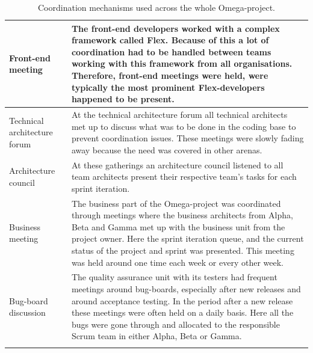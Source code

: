 \begin{center}
\begin{longtable}{| p{3.5cm} | p{8cm} |}
    Front-end meeting & The front-end developers worked with a complex framework called Flex. Because of this a lot of coordination had to be handled between teams working with this framework from all organisations. Therefore, front-end meetings were held, were typically the most prominent Flex-developers happened to be present. \\ \hline
    Technical architecture forum & At the technical architecture forum all technical architects met up to discuss what was to be done in the coding base to prevent coordination issues. These meetings were slowly fading away because the need was covered in other arenas. \\ \hline
    Architecture council & At these gatherings an architecture council listened to all team architects present their respective team's tasks for each sprint iteration. \\ \hline
    Business meeting & The business part of the Omega-project was coordinated through meetings where the business architects from Alpha, Beta and Gamma met up with the business unit from the project owner. Here the sprint iteration queue, and the current status of the project and sprint was presented. This meeting was held around one time each week or every other week. \\ \hline
    Bug-board discussion & The quality assurance unit with its testers had frequent meetings around bug-boards, especially after new releases and around acceptance testing. In the period after a new release these meetings were often held on a daily basis. Here all the bugs were gone through and allocated to the responsible Scrum team in either Alpha, Beta or Gamma. \\ \hline
    
    \caption{Coordination mechanisms used across the whole Omega-project.}
    \label{cmuatwo} 
    \end{longtable}
\end{center}


